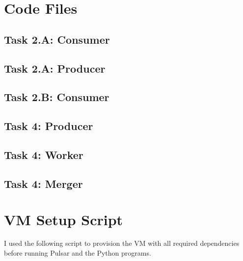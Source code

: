 \documentclass[11pt,a4paper]{article}
\begin{document}
\begin{appendices}
\section{Code Files}
\label{app:code}

\subsection{Task 2.A: Consumer}



\subsection{Task 2.A: Producer}



\subsection{Task 2.B: Consumer}



\subsection{Task 4: Producer}



\subsection{Task 4: Worker}



\subsection{Task 4: Merger}



\section{VM Setup Script}

I used the following script to provision the VM with all required dependencies
before running Pulsar and the Python programs.



\end{appendices}
\end{document}
